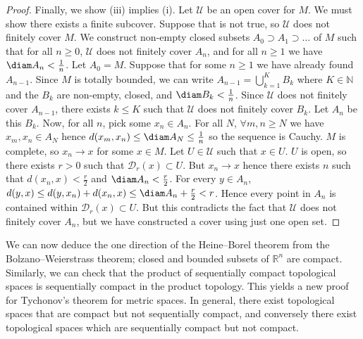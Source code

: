 \begin{proof}
	Finally, we show (iii) implies (i).
	Let \( \mathcal U \) be an open cover for \( M \).
	We must show there exists a finite subcover.
	Suppose that is not true, so \( \mathcal U \) does not finitely cover \( M \).
	We construct non-empty closed subsets \( A_0 \supset A_1 \supset \dots \) of \( M \) such that for all \( n \geq 0 \), \( \mathcal U \) does not finitely cover \( A_n \), and for all \( n \geq 1 \) we have \( \diam A_n < \frac{1}{n} \).
	Let \( A_0 = M \).
	Suppose that for some \( n \geq 1 \) we have already found \( A_{n-1} \).
	Since \( M \) is totally bounded, we can write \( A_{n-1} = \bigcup_{k=1}^K B_k \) where \( K \in \mathbb N \) and the \( B_k \) are non-empty, closed, and \( \diam B_k < \frac{1}{n} \).
	Since \( \mathcal U \) does not finitely cover \( A_{n-1} \), there exists \( k \leq K \) such that \( \mathcal U \) does not finitely cover \( B_k \).
	Let \( A_n \) be this \( B_k \).
	Now, for all \( n \), pick some \( x_n \in A_n \).
	For all \( N \), \( \forall m,n \geq N \) we have \( x_m, x_n \in A_N \) hence \( d(x_m, x_n) \leq \diam A_N \leq \frac{1}{n} \) so the sequence is Cauchy.
	\( M \) is complete, so \( x_n \to x \) for some \( x \in M \).
	Let \( U \in \mathcal U \) such that \( x \in U \).
	\( U \) is open, so there exists \( r > 0 \) such that \( \mathcal D_r(x) \subset U \).
	But \( x_n \to x \) hence there exists \( n \) such that \( d(x_n, x) < \frac{r}{2} \) and \( \diam A_n < \frac{r}{2} \).
	For every \( y \in A_n \), \( d(y,x) \leq d(y,x_n) + d(x_n, x) \leq \diam A_n + \frac{r}{2} < r \).
	Hence every point in \( A_n \) is contained within \( \mathcal D_r(x) \subset U \).
	But this contradicts the fact that \( \mathcal U \) does not finitely cover \( A_n \), but we have constructed a cover using just one open set.
\end{proof}
\begin{remark}
	We can now deduce the one direction of the Heine--Borel theorem from the Bolzano--Weierstrass theorem; closed and bounded subsets of \( \mathbb R^n \) are compact.
	Similarly, we can check that the product of sequentially compact topological spaces is sequentially compact in the product topology.
	This yields a new proof for Tychonov's theorem for metric spaces.
	In general, there exist topological spaces that are compact but not sequentially compact, and conversely there exist topological spaces which are sequentially compact but not compact.
\end{remark}
